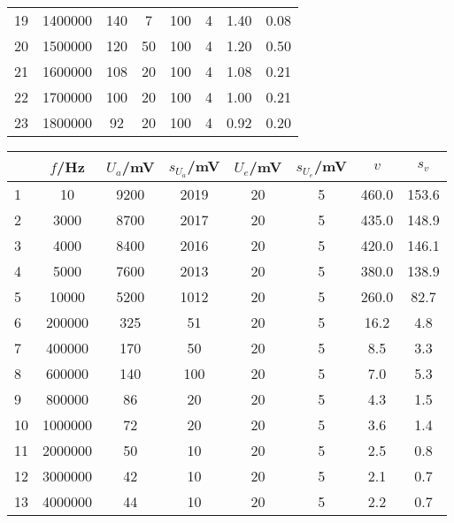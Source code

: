 \begin{center}
\begin{tabular}{l | c c c c c | c c}
        19 &  1400000 &   140 &         7 &     100 &         4 &   1.40 &  0.08 \\    
        20 &  1500000 &   120 &        50 &     100 &         4 &   1.20 &  0.50 \\    
        21 &  1600000 &   108 &        20 &     100 &         4 &   1.08 &  0.21 \\    
        22 &  1700000 &   100 &        20 &     100 &         4 &   1.00 &  0.21 \\    
        23 &  1800000 &    92 &        20 &     100 &         4 &   0.92 &  0.20 \\    
    \end{tabular}
    \label{tab:1MOhm}
    \newpage
    \begin{tabular}{l | c c c c c | c c}
        {} &       $f$/Hz &  $U_a$/mV &  $s_{U_a}$/mV &  $U_e$/mV &  $s_{U_e}$/mV &   $v$ &   $s_v$ \\
        \hline
        1  &        10 &  9200 &      2019 &    20 &         5 &  460.0 &  153.6 \\  
        2  &      3000 &  8700 &      2017 &    20 &         5 &  435.0 &  148.9 \\  
        3  &      4000 &  8400 &      2016 &    20 &         5 &  420.0 &  146.1 \\  
        4  &      5000 &  7600 &      2013 &    20 &         5 &  380.0 &  138.9 \\  
        5  &     10000 &  5200 &      1012 &    20 &         5 &  260.0 &   82.7 \\  
        6  &    200000 &   325 &        51 &    20 &         5 &   16.2 &    4.8 \\  
        7  &    400000 &   170 &        50 &    20 &         5 &    8.5 &    3.3 \\  
        8  &    600000 &   140 &       100 &    20 &         5 &    7.0 &    5.3 \\  
        9  &    800000 &    86 &        20 &    20 &         5 &    4.3 &    1.5 \\  
        10 &   1000000 &    72 &        20 &    20 &         5 &    3.6 &    1.4 \\  
        11 &   2000000 &    50 &        10 &    20 &         5 &    2.5 &    0.8 \\  
        12 &   3000000 &    42 &        10 &    20 &         5 &    2.1 &    0.7 \\  
        13 &   4000000 &    44 &        10 &    20 &         5 &    2.2 &    0.7 \\  

\end{tabular}
\end{center}
